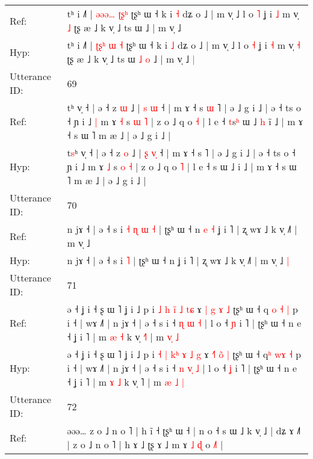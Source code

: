 \documentclass[10pt]{article}
\DeclareRobustCommand{\hl}[1]{{\textcolor{red}{#1}}}
\begin{document}
\begin{longtable}{ll}
Ref: & tʰ i ˩˥ | \hl{ə}\hl{ə}\hl{ə}\hl{…} \hl{ʈ}\hl{ʂ}\hl{ʰ} ʈʂʰ ɯ ˧ k i \hl{˧} dʑ o ˩ | m v̩ ˩ l o \hl{˥} ʝ i \hl{˩} m v̩ \hl{˩} ʈʂ æ ˩ k v̩ ˩ ts ɯ\hl{}\hl{}\hl{}\hl{} ˩ | m v̩ ˩\hl{}\hl{}
 \\
Hyp: & tʰ i ˩˥ | \hl{}\hl{ʈ}\hl{ʂ}\hl{ʰ} \hl{ɯ}\hl{ }\hl{˧} ʈʂʰ ɯ ˧ k i \hl{˩} dʑ o ˩ | m v̩ ˩ l o \hl{˧} ʝ i \hl{˧} m v̩ \hl{˧} ʈʂ æ ˩ k v̩ ˩ ts ɯ\hl{ }\hl{˩}\hl{ }\hl{o} ˩ | m v̩ ˩\hl{ }\hl{|}
 \\
\midrule
Utterance ID: & 69 \\
Ref: & t\hl{}ʰ v̩ ˧ | ə ˧ z \hl{ɯ} ˩ | \hl{s} \hl{}\hl{ɯ} ˧ | m ɤ ˧ s\hl{ }\hl{ɯ} ˥ | ə ˩ g i ˩ | ə ˧ ts o ˧ ɲ i ˩\hl{ }\hl{|} m ɤ \hl{˧} s \hl{ɯ} \hl{˥} | z o ˩ q o \hl{˧} | l e ˧ \hl{t}s\hl{ʰ} ɯ ˩\hl{ }\hl{h} i\hl{̃} ˩ | m ɤ ˧ s ɯ ˥ m æ ˩ | ə ˩ g i ˩ |
 \\
Hyp: & t\hl{s}ʰ v̩ ˧ | ə ˧ z \hl{o} ˩ | \hl{ʂ} \hl{v}\hl{̩} ˧ | m ɤ ˧ s\hl{}\hl{} ˥ | ə ˩ g i ˩ | ə ˧ ts o ˧ ɲ i ˩\hl{}\hl{} m ɤ \hl{˩} s \hl{o} \hl{˧} | z o ˩ q o \hl{˥} | l e ˧ \hl{}s\hl{} ɯ ˩\hl{}\hl{} i\hl{} ˩ | m ɤ ˧ s ɯ ˥ m æ ˩ | ə ˩ g i ˩ |
 \\
\midrule
Utterance ID: & 70 \\
Ref: & n jɤ ˧ | ə ˧ s i\hl{ }\hl{˧}\hl{ }\hl{ɳ}\hl{ }\hl{ɯ} \hl{˧} | ʈʂʰ ɯ ˧ n\hl{ }\hl{e}\hl{ }\hl{˧} ʝ i ˥ | ʐ wɤ ˩ k v̩ ˩˥ | m v̩ ˩\hl{}\hl{}
 \\
Hyp: & n jɤ ˧ | ə ˧ s i\hl{}\hl{}\hl{}\hl{}\hl{}\hl{} \hl{˥} | ʈʂʰ ɯ ˧ n\hl{}\hl{}\hl{}\hl{} ʝ i ˥ | ʐ wɤ ˩ k v̩ ˩˥ | m v̩ ˩\hl{ }\hl{|}
 \\
\midrule
Utterance ID: & 71 \\
Ref: & ə ˧ ʝ i ˧ ʂ ɯ ˥ ʝ i ˩ p i \hl{˩} \hl{h} \hl{i}\hl{̃} \hl{˩} \hl{}\hl{t}\hl{ɕ} ɤ \hl{|}\hl{ }\hl{g}\hl{ }\hl{ɤ} \hl{˩} ʈʂʰ ɯ ˧ q\hl{ }\hl{o}\hl{ }\hl{˧} \hl{|} p i ˧ | wɤ ˩˥ | n jɤ ˧ | ə ˧ s i ˧ \hl{ɳ} \hl{}\hl{ɯ} \hl{˧} | l o ˧ \hl{ɲ} i ˥ | ʈʂʰ ɯ ˧ n e ˧ ʝ i ˥ | m \hl{æ} \hl{˧} k v̩ \hl{˧}˥ | m \hl{}\hl{v}\hl{̩} \hl{˩}
 \\
Hyp: & ə ˧ ʝ i ˧ ʂ ɯ ˥ ʝ i ˩ p i \hl{˧} \hl{|} \hl{k}\hl{ʰ} \hl{ɤ} \hl{˩}\hl{ }\hl{g} ɤ \hl{˧}\hl{˥}\hl{ }\hl{o}\hl{̃} \hl{|} ʈʂʰ ɯ ˧ q\hl{ʰ}\hl{ }\hl{w}\hl{ɤ} \hl{˧} p i ˧ | wɤ ˩˥ | n jɤ ˧ | ə ˧ s i ˧ \hl{n} \hl{v}\hl{̩} \hl{˩} | l o ˧ \hl{ʝ} i ˥ | ʈʂʰ ɯ ˧ n e ˧ ʝ i ˥ | m \hl{ɤ} \hl{˩} k v̩ \hl{}˥ | m \hl{æ}\hl{ }\hl{˩} \hl{|}
 \\
\midrule
Utterance ID: & 72 \\
Ref: & əəə… z o ˩ n o ˥ | h ĩ ˧ ʈʂʰ ɯ ˧ | n o ˧ s ɯ ˩ k v̩ ˩ | dʑ ɤ\hl{}\hl{}\hl{}\hl{} ˩˥ | z o ˩ n o ˥ | h ɤ ˩ ʈʂ ɤ ˩ m ɤ \hl{˩} \hl{ɖ} o \hl{˩}\hl{˥} |

\end{longtable}
\end{document}
